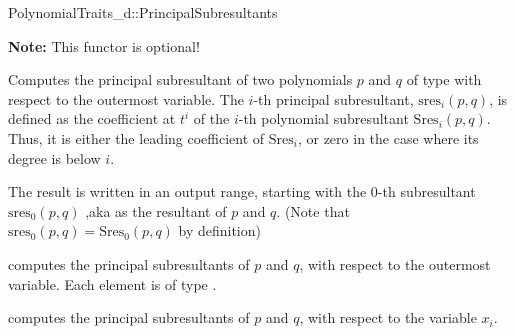 \begin{ccRefConcept}{PolynomialTraits_d::PrincipalSubresultants}

\textbf{Note:} This functor is optional!

\ccDefinition

Computes the principal subresultant of two polynomials $p$ and $q$ of 
type  
with respect to the outermost variable.
The $i$-th principal subresultant, $\mathrm{sres}_i(p,q)$,
is defined as the coefficient at $t^i$ of the $i$-th polynomial
subresultant $\mathrm{Sres}_i(p,q)$. Thus, it is either the leading
coefficient of $\mathrm{Sres}_i$, or zero in the case where its degree is 
below $i$.

The result is written in an output range, starting with the $0$-th subresultant
$\mathrm{sres}_0(p,q)$
,aka as the resultant of $p$ and $q$.
(Note that $\mathrm{sres}_0(p,q)=\mathrm{Sres}_0(p,q)$ by definition)


\ccOperations
{}
         { computes the principal subresultants of $p$ and $q$, 
           with respect to the outermost variable. Each element is of type
           .}

         { computes the principal subresultants of $p$ and $q$, 
           with respect to the variable $x_i$.}


\ccSeeAlso

\\
\\

\end{ccRefConcept}
